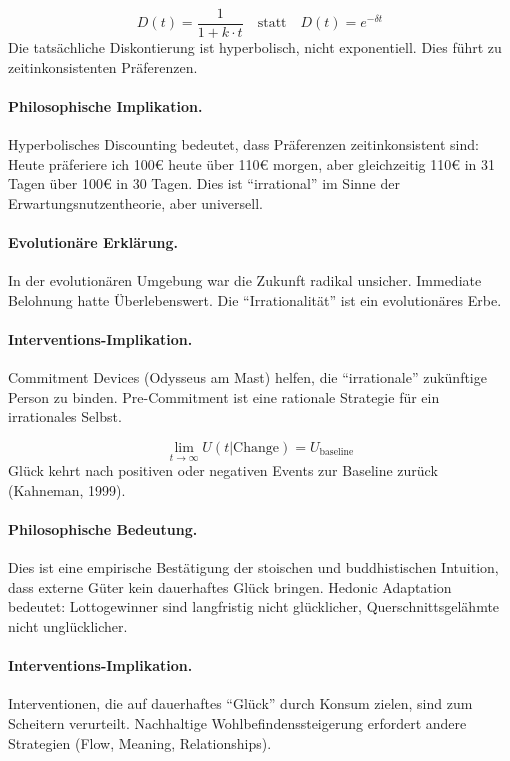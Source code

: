 \begin{axiom}
\begin{equation}
D(t) = \frac{1}{1 + k \cdot t} \quad \text{statt} \quad D(t) = e^{-\delta t}
\end{equation}
Die tatsächliche Diskontierung ist hyperbolisch, nicht exponentiell. Dies führt zu zeitinkonsistenten Präferenzen.

\paragraph{Philosophische Implikation.}
Hyperbolisches Discounting bedeutet, dass Präferenzen zeitinkonsistent sind: Heute präferiere ich 100€ heute über 110€ morgen, aber gleichzeitig 110€ in 31 Tagen über 100€ in 30 Tagen. Dies ist ``irrational'' im Sinne der Erwartungsnutzentheorie, aber universell.

\paragraph{Evolutionäre Erklärung.}
In der evolutionären Umgebung war die Zukunft radikal unsicher. Immediate Belohnung hatte Überlebenswert. Die ``Irrationalität'' ist ein evolutionäres Erbe.

\paragraph{Interventions-Implikation.}
Commitment Devices (Odysseus am Mast) helfen, die ``irrationale'' zukünftige Person zu binden. Pre-Commitment ist eine rationale Strategie für ein irrationales Selbst.
\end{axiom}

\begin{axiom}
\begin{equation}
\lim_{t \rightarrow \infty} U(t|\text{Change}) = U_{\text{baseline}}
\end{equation}
Glück kehrt nach positiven oder negativen Events zur Baseline zurück (Kahneman, 1999).

\paragraph{Philosophische Bedeutung.}
Dies ist eine empirische Bestätigung der stoischen und buddhistischen Intuition, dass externe Güter kein dauerhaftes Glück bringen. Hedonic Adaptation bedeutet: Lottogewinner sind langfristig nicht glücklicher, Querschnittsgelähmte nicht unglücklicher.

\paragraph{Interventions-Implikation.}
Interventionen, die auf dauerhaftes ``Glück'' durch Konsum zielen, sind zum Scheitern verurteilt. Nachhaltige Wohlbefindenssteigerung erfordert andere Strategien (Flow, Meaning, Relationships).
\end{axiom}

